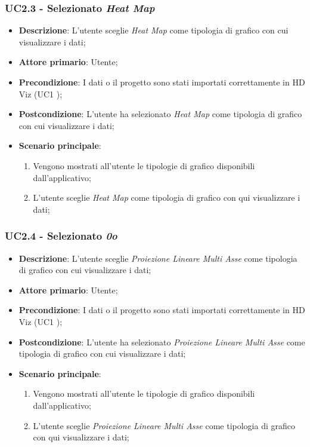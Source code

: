 \subsubsection{UC2.3 - Selezionato \emph{Heat Map}}
\label{ssub:uc2.3}

	\begin{itemize}
		\item \textbf{Descrizione}: L'utente sceglie \emph{Heat Map} come tipologia di grafico con cui visualizzare i dati;
		\item \textbf{Attore primario}: Utente;
		\item \textbf{Precondizione}: I dati o il progetto sono stati importati correttamente in HD Viz (UC1 );
		\item \textbf{Postcondizione}: L'utente ha selezionato \emph{Heat Map} come tipologia di grafico con cui visualizzare i dati;
		\item \textbf{Scenario principale}:
			\begin{enumerate}
				\item Vengono mostrati all'utente le tipologie di grafico disponibili dall'applicativo;
				\item L'utente sceglie \emph{Heat Map} come tipologia di grafico con qui visualizzare i dati;
			\end{enumerate}
	\end{itemize}

\subsubsection{UC2.4 - Selezionato \emph{0o}}
\label{ssub:uc2.4}

	\begin{itemize}
		\item \textbf{Descrizione}: L'utente sceglie \emph{Proiezione Lineare Multi Asse} come tipologia di grafico con cui visualizzare i dati;
		\item \textbf{Attore primario}: Utente;
		\item \textbf{Precondizione}: I dati o il progetto sono stati importati correttamente in HD Viz (UC1 );
		\item \textbf{Postcondizione}: L'utente ha selezionato \emph{Proiezione Lineare Multi Asse} come tipologia di grafico con cui visualizzare i dati;
		\item \textbf{Scenario principale}:
			\begin{enumerate}
				\item Vengono mostrati all'utente le tipologie di grafico disponibili dall'applicativo;
				\item L'utente sceglie \emph{Proiezione Lineare Multi Asse} come tipologia di grafico con qui visualizzare i dati;
			\end{enumerate}
	\end{itemize}
